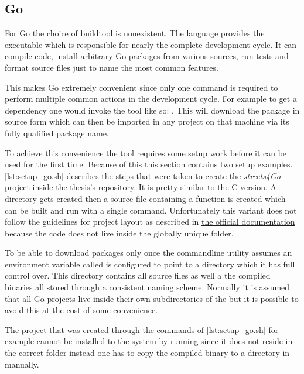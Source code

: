 \subsection{Go}
\label{subsec:Implementation::Setup::Go}

For Go the choice of buildtool is nonexistent. The language provides the  executable which is responsible for nearly the complete development cycle. It can compile code, install arbitrary Go packages from various sources, run tests and format source files just to name the most common features.

This makes Go extremely convenient since only one command is required to perform multiple common actions in the development cycle. For example to get a dependency one would invoke the tool like so: . This will download the package in source form which can then be imported in any project on that machine via its fully qualified package name.

To achieve this convenience the  tool requires some setup work before it can be used for the first time. Because of this this section contains two setup examples.
\\


\autoref{lst:setup_go.sh} describes the steps that were taken to create the \textit{streets4Go} project inside the thesis's repository. It is pretty similar to the C version. A directory gets created then a source file containing a  function is created which can be built and run with a single command. Unfortunately this variant does not follow the guidelines for project layout as described in \href{https://golang.org/doc/code.html#Workspaces}{the official documentation} because the code does not live inside the globally unique  folder.

To be able to download packages only once the  commandline utility assumes an environment variable called  is configured to point to a directory which it has full control over. This directory contains all source files as well a the compiled binaries all stored through a consistent naming scheme. Normally it is assumed that all Go projects live inside their own subdirectories of the  but it is possible to avoid this at the cost of some convenience.

The project that was created through the commands of \autoref{lst:setup_go.sh} for example cannot be installed to the system by running  since it does not reside in the correct folder instead one has to copy the compiled binary to a directory in  manually.


